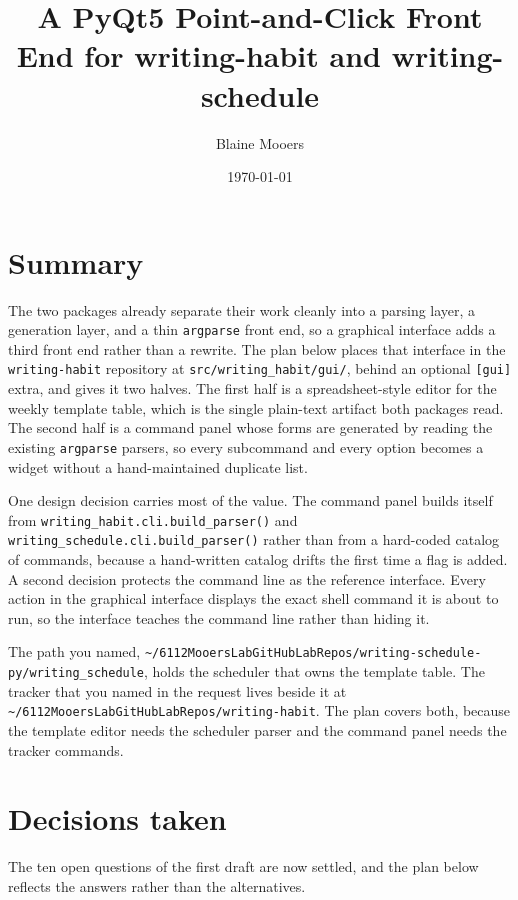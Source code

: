\documentclass[11pt]{article}
\author{Blaine Mooers}
\date{\today}
\title{A PyQt5 Point-and-Click Front End for writing-habit and writing-schedule}
\begin{document}
\maketitle
\section{Summary}
\label{sec:org37802ad}

The two packages already separate their work cleanly into a parsing layer, a
generation layer, and a thin \texttt{argparse} front end, so a graphical interface
adds a third front end rather than a rewrite. The plan below places that
interface in the \texttt{writing-habit} repository at \texttt{src/writing\_habit/gui/}, behind
an optional \texttt{[gui]} extra, and gives it two halves. The first half is a
spreadsheet-style editor for the weekly template table, which is the single
plain-text artifact both packages read. The second half is a command panel
whose forms are generated by reading the existing \texttt{argparse} parsers, so every
subcommand and every option becomes a widget without a hand-maintained
duplicate list.

One design decision carries most of the value. The command panel builds itself
from \texttt{writing\_habit.cli.build\_parser()} and \texttt{writing\_schedule.cli.build\_parser()}
rather than from a hard-coded catalog of commands, because a hand-written
catalog drifts the first time a flag is added. A second decision protects the
command line as the reference interface. Every action in the graphical
interface displays the exact shell command it is about to run, so the interface
teaches the command line rather than hiding it.

The path you named, \texttt{\textasciitilde{}/6112MooersLabGitHubLabRepos/writing-schedule-py/writing\_schedule},
holds the scheduler that owns the template table. The tracker that you named in
the request lives beside it at \texttt{\textasciitilde{}/6112MooersLabGitHubLabRepos/writing-habit}.
The plan covers both, because the template editor needs the scheduler parser
and the command panel needs the tracker commands.
\section{Decisions taken}
\label{sec:org1cb7106}

The ten open questions of the first draft are now settled, and the plan below
reflects the answers rather than the alternatives.
\end{document}
